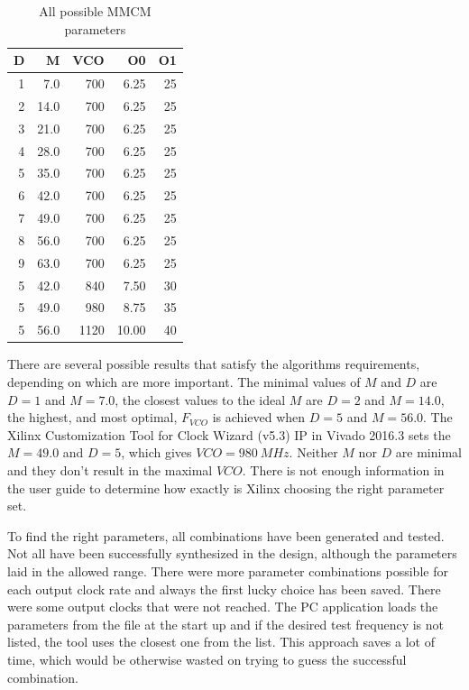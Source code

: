 \begin{table}[h]
\begin{tabular}{@{}rrrrr@{}}
\toprule
D & M & VCO & O0 & O1 \\
\midrule
1 & 7.0 & 700 & 6.25 & 25 \\ 
2 & 14.0 & 700 & 6.25 & 25 \\ 
3 & 21.0 & 700 & 6.25 & 25 \\ 
4 & 28.0 & 700 & 6.25 & 25 \\ 
5 & 35.0 & 700 & 6.25 & 25 \\  
6 & 42.0 & 700 & 6.25 & 25 \\ 
7 & 49.0 & 700 & 6.25 & 25 \\ 
8 & 56.0 & 700 & 6.25 & 25 \\ 
9 & 63.0 & 700 & 6.25 & 25 \\ 
5 & 42.0 & 840 & 7.50 & 30 \\ 
5 & 49.0 & 980 & 8.75 & 35 \\ 
5 & 56.0 & 1120 & 10.00 & 40 \\ 
\bottomrule
\end{tabular}
\centering
\caption{All possible MMCM parameters} \label{tab:MMCM}
\end{table}

There are several possible results that satisfy the algorithms requirements, depending on which are more important. The minimal values of $M$ and $D$ are $D=1$ and $M=7.0$, the closest values to the ideal $M$ are $D=2$ and $M=14.0$, the highest, and most optimal, $F_{VCO}$ is achieved when $D=5$ and $M=56.0$. The Xilinx Customization Tool for Clock Wizard (v5.3) IP in Vivado 2016.3 sets the $M = 49.0$ and $D=5$, which gives $VCO = 980\ MHz$. Neither $M$ nor $D$ are minimal and they don't result in the maximal $VCO$. There is not enough information in the user guide to determine how exactly is Xilinx choosing the right parameter set.

To find the right parameters, all combinations have been generated and tested. Not all have been successfully synthesized in the design, although the parameters laid in the allowed range. There were more parameter combinations possible for each output clock rate and always the first lucky choice has been saved. There were some output clocks that were not reached. The PC application loads the parameters from the file at the start up and if the desired test frequency is not listed, the tool uses the closest one from the list. This approach saves a lot of time, which would be otherwise wasted on trying to guess the successful combination.
